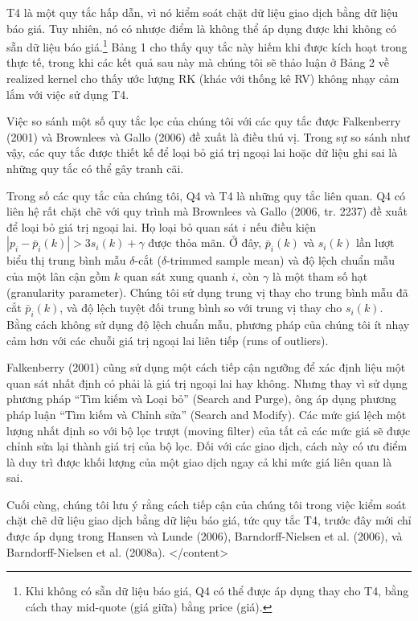 T4 là một quy tắc hấp dẫn, vì nó kiểm soát chặt dữ liệu giao dịch bằng dữ liệu báo giá. Tuy nhiên, nó có nhược điểm là không thể áp dụng được khi không có sẵn dữ liệu báo giá.\footnote{Khi không có sẵn dữ liệu báo giá, Q4 có thể được áp dụng thay cho T4, bằng cách thay mid-quote (giá giữa) bằng price (giá).} Bảng 1 cho thấy quy tắc này hiếm khi được kích hoạt trong thực tế, trong khi các kết quả sau này mà chúng tôi sẽ thảo luận ở Bảng 2 về realized kernel cho thấy ước lượng RK (khác với thống kê RV) không nhạy cảm lắm với việc sử dụng T4.

Việc so sánh một số quy tắc lọc của chúng tôi với các quy tắc được Falkenberry (2001) và Brownlees và Gallo (2006) đề xuất là điều thú vị. Trong sự so sánh như vậy, các quy tắc được thiết kế để loại bỏ giá trị ngoại lai hoặc dữ liệu ghi sai là những quy tắc có thể gây tranh cãi.

Trong số các quy tắc của chúng tôi, Q4 và T4 là những quy tắc liên quan. Q4 có liên hệ rất chặt chẽ với quy trình mà Brownlees và Gallo (2006, tr. 2237) đề xuất để loại bỏ giá trị ngoại lai. Họ loại bỏ quan sát $i$ nếu điều kiện $|p_i - \bar{p}_i(k)| > 3 s_i(k) + \gamma$ được thỏa mãn. Ở đây, $\bar{p}_i(k)$ và $s_i(k)$ lần lượt biểu thị trung bình mẫu $\delta$-cắt ($\delta$-trimmed sample mean) và độ lệch chuẩn mẫu của một lân cận gồm $k$ quan sát xung quanh $i$, còn $\gamma$ là một tham số hạt (granularity parameter). Chúng tôi sử dụng trung vị thay cho trung bình mẫu đã cắt $\bar{p}_i(k)$, và độ lệch tuyệt đối trung bình so với trung vị thay cho $s_i(k)$. Bằng cách không sử dụng độ lệch chuẩn mẫu, phương pháp của chúng tôi ít nhạy cảm hơn với các chuỗi giá trị ngoại lai liên tiếp (runs of outliers).

Falkenberry (2001) cũng sử dụng một cách tiếp cận ngưỡng để xác định liệu một quan sát nhất định có phải là giá trị ngoại lai hay không. Nhưng thay vì sử dụng phương pháp ``Tìm kiếm và Loại bỏ'' (Search and Purge), ông áp dụng phương pháp luận ``Tìm kiếm và Chỉnh sửa'' (Search and Modify). Các mức giá lệch một lượng nhất định so với bộ lọc trượt (moving filter) của tất cả các mức giá sẽ được chỉnh sửa lại thành giá trị của bộ lọc. Đối với các giao dịch, cách này có ưu điểm là duy trì được khối lượng của một giao dịch ngay cả khi mức giá liên quan là sai.

Cuối cùng, chúng tôi lưu ý rằng cách tiếp cận của chúng tôi trong việc kiểm soát chặt chẽ dữ liệu giao dịch bằng dữ liệu báo giá, tức quy tắc T4, trước đây mới chỉ được áp dụng trong Hansen và Lunde (2006), Barndorff-Nielsen et al. (2006), và Barndorff-Nielsen et al. (2008a).
</content>
